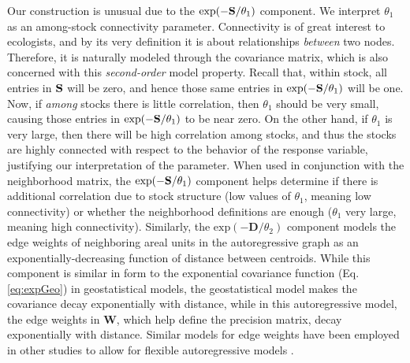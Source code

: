 \documentclass[11pt, titlepage]{article}\usepackage[]{graphicx}\usepackage[]{color}
\begin{document}
\begin{spacing}{1.9}
\begin{flushleft}
Our construction is unusual due to the $\exp(-\mathbf{S}/\theta_1)$ component.  We interpret $\theta_1$ as an among-stock connectivity parameter.  Connectivity is of great interest to ecologists, and by its very definition it is about relationships \emph{between} two nodes.  Therefore, it is naturally modeled through the covariance matrix, which is also concerned with this \emph{second-order} model property.  Recall that, within stock, all entries in $\mathbf{S}$ will be zero, and hence those same entries in $\exp(-\mathbf{S}/\theta_1)$ will be one.  Now, if \emph{among} stocks there is little correlation, then $\theta_1$ should be very small, causing those entries in $\exp(-\mathbf{S}/\theta_1)$ to be near zero.  On the  other hand, if $\theta_1$ is very large, then there will be high correlation among stocks, and thus the stocks are highly connected with respect to the behavior of the response variable, justifying our interpretation of the parameter.  When used in conjunction with the neighborhood matrix, the $\exp(-\mathbf{S}/\theta_1)$ component helps determine if there is additional correlation due to stock structure (low values of $\theta_1$, meaning low connectivity) or whether the neighborhood definitions are enough ($\theta_1$ very large, meaning high connectivity). Similarly, the $\text{exp}(-\mathbf{D}/\theta_2)$ component models the edge weights of neighboring areal units in the autoregressive graph as an exponentially-decreasing function of distance between centroids.  While this component is similar in form to the exponential covariance function (Eq. \ref{eq:expGeo}) in geostatistical models, the geostatistical model makes the covariance decay exponentially with distance, while in this autoregressive model, the edge weights in $\mathbf{W}$, which help define the precision matrix, decay exponentially with distance.   Similar models for edge weights have been employed in other studies to allow for flexible autoregressive models \citep[e.g.,][]{Cres:Chan:spat:1989,Hank:Hoot:Knic:Oyle:late:2016}.


\end{flushleft}
\end{spacing}
\end{document}
